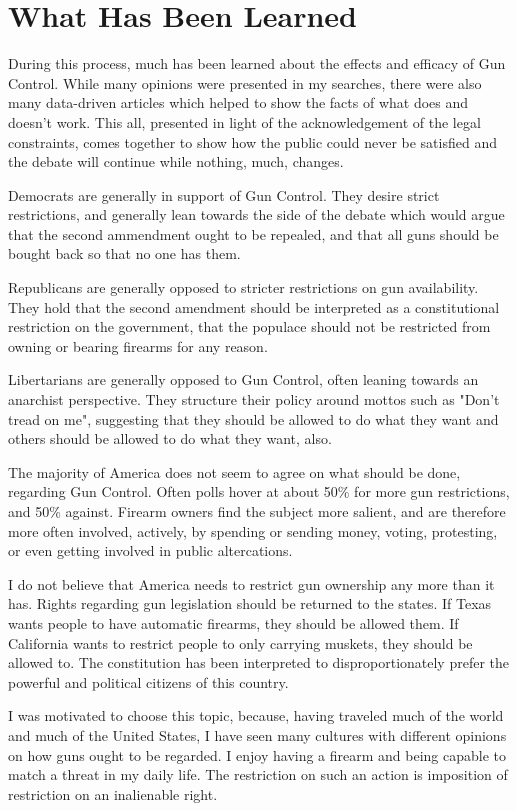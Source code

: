 \documentclass [12pt]{article}
\begin{document}
\pagebreak
\section{What Has Been Learned}
During this process, much has been learned about the effects and efficacy of Gun Control. While many opinions were presented in my searches, there were also many data-driven articles which helped to show the facts of what does and doesn't work. This all, presented in light of the acknowledgement of the legal constraints, comes together to show how the public could never be satisfied and the debate will continue while nothing, much, changes. 
\par
Democrats are generally in support of Gun Control. They desire strict restrictions, and generally lean towards the side of the debate which would argue that the second ammendment ought to be repealed, and that all guns should be bought back so that no one has them. 
\par
Republicans are generally opposed to stricter restrictions on gun availability. They hold that the second amendment should be interpreted as a constitutional restriction on the government, that the populace should not be restricted from owning or bearing firearms for any reason. 
\par
Libertarians are generally opposed to Gun Control, often leaning towards an anarchist perspective. They structure their policy around mottos such as "Don't tread on me", suggesting that they should be allowed to do what they want and others should be allowed to do what they want, also. 
\par
The majority of America does not seem to agree on what should be done, regarding Gun Control. Often polls hover at about 50\% for more gun restrictions, and 50\% against. Firearm owners find the subject more salient, and are therefore more often involved, actively, by spending or sending money, voting, protesting, or even getting involved in public altercations. 
\par
I do not believe that America needs to restrict gun ownership any more than it has. Rights regarding gun legislation should be returned to the states. If Texas wants people to have automatic firearms, they should be allowed them. If California wants to restrict people to only carrying muskets, they should be allowed to. The constitution has been interpreted to disproportionately prefer the powerful and political citizens of this country. 
\par
I was motivated to choose this topic, because, having traveled much of the world and much of the United States, I have seen many cultures with different opinions on how guns ought to be regarded. I enjoy having a firearm and being capable to match a threat in my daily life. The restriction on such an action is imposition of restriction on an inalienable right. 
\end{document}
